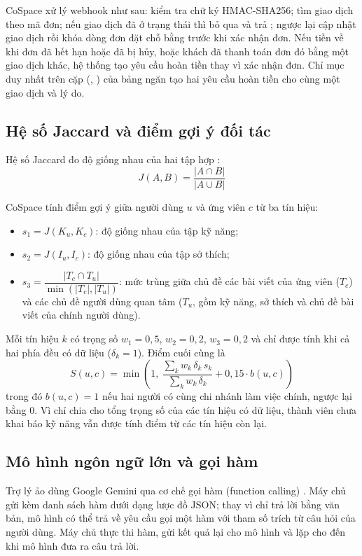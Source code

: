 CoSpace xử lý webhook như sau: kiểm tra chữ ký HMAC-SHA256; tìm giao dịch theo mã đơn; nếu giao dịch đã ở trạng thái  thì bỏ qua và trả ; ngược lại cập nhật giao dịch rồi khóa dòng đơn đặt chỗ bằng  trước khi xác nhận đơn. Nếu tiền về khi đơn đã hết hạn hoặc đã bị hủy, hoặc khách đã thanh toán đơn đó bằng một giao dịch khác, hệ thống tạo yêu cầu hoàn tiền thay vì xác nhận đơn. Chỉ mục duy nhất trên cặp (, ) của bảng  ngăn tạo hai yêu cầu hoàn tiền cho cùng một giao dịch và lý do.

\subsection{Hệ số Jaccard và điểm gợi ý đối tác}
Hệ số Jaccard đo độ giống nhau của hai tập hợp \cite{jaccard1912}:
\begin{equation}
    J(A, B) = \frac{|A \cap B|}{|A \cup B|}
    \label{eq:jaccard_formula}
\end{equation}

CoSpace tính điểm gợi ý giữa người dùng $u$ và ứng viên $c$ từ ba tín hiệu:
\begin{itemize}
    \item $s_1 = J(K_u, K_c)$: độ giống nhau của tập kỹ năng;
    \item $s_2 = J(I_u, I_c)$: độ giống nhau của tập sở thích;
    \item $s_3 = \dfrac{|T_c \cap T_u|}{\min(|T_c|, |T_u|)}$: mức trùng giữa chủ đề các bài viết của ứng viên ($T_c$) và các chủ đề người dùng quan tâm ($T_u$, gồm kỹ năng, sở thích và chủ đề bài viết của chính người dùng).
\end{itemize}
Mỗi tín hiệu $k$ có trọng số $w_1 = 0{,}5$, $w_2 = 0{,}2$, $w_3 = 0{,}2$ và chỉ được tính khi cả hai phía đều có dữ liệu ($\delta_k = 1$). Điểm cuối cùng là
\begin{equation}
    S(u, c) = \min\left(1,\ \frac{\sum_k w_k\, \delta_k\, s_k}{\sum_k w_k\, \delta_k} + 0{,}15 \cdot b(u, c)\right)
    \label{eq:weighted_jaccard}
\end{equation}
trong đó $b(u, c) = 1$ nếu hai người có cùng chi nhánh làm việc chính, ngược lại bằng 0. Vì chỉ chia cho tổng trọng số của các tín hiệu có dữ liệu, thành viên chưa khai báo kỹ năng vẫn được tính điểm từ các tín hiệu còn lại.

\subsection{Mô hình ngôn ngữ lớn và gọi hàm}
Trợ lý ảo dùng Google Gemini qua cơ chế gọi hàm (function calling) \cite{gemini_function_calling}. Máy chủ gửi kèm danh sách hàm dưới dạng lược đồ JSON; thay vì chỉ trả lời bằng văn bản, mô hình có thể trả về yêu cầu gọi một hàm với tham số trích từ câu hỏi của người dùng. Máy chủ thực thi hàm, gửi kết quả lại cho mô hình và lặp cho đến khi mô hình đưa ra câu trả lời.

